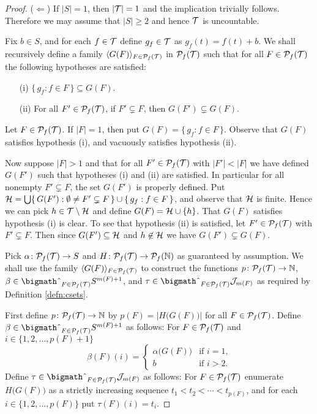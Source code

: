 \begin{proof}
  ($\Leftarrow$)
  If $|S| = 1$, then $|\mathcal{T}| = 1$ and the implication trivially follows. 
  Therefore we may assume that $|S| \ge 2$ and hence $\mathcal{T}$ is uncountable. 

  Fix $b \in S$, and for each $f \in \mathcal{T}$ define $g_f \in \mathcal{T}$ as $g_f(t) = f(t) + b$. 
  We shall recursively define a family $\langle G(F) \rangle_{F \in \mathcal{P}_f(\mathcal{T})}$ in $\mathcal{P}_f(\mathcal{T})$ such that for all $F \in \mathcal{P}_f(\mathcal{T})$ the following hypotheses are satisfied: 
  \begin{itemize}
    \item[(i)]
      $\{\, g_f : f \in F \,\} \subseteq G(F)$.

    \item[(ii)]
      For all $F' \in \mathcal{P}_f(\mathcal{T})$, if $F' \subsetneq F$, then $G(F') \subsetneq G(F)$. 
  \end{itemize}

  Let $F \in \mathcal{P}_f(\mathcal{T})$. 
  If $|F| = 1$, then put $G(F) = \{\, g_f : f \in F \,\}$.
  Observe that $G(F)$ satisfies hypothesis (i), and vacuously satisfies hypothesis (ii).

  Now suppose $|F| > 1$ and that for all $F' \in \mathcal{P}_f(\mathcal{T})$ with $|F'| < |F|$ we have defined $G(F')$ such that hypotheses (i) and (ii) are satisfied. 
  In particular for all nonempty $F' \subsetneq F$, the set $G(F')$ is properly defined. 
  Put $\mathcal{H} = \bigcup\{\, G(F') : \emptyset \ne F' \subsetneq F \,\} \cup \{\, g_f : f \in F \,\}$, and observe that $\mathcal{H}$ is finite. 
  Hence we can pick $h \in \mathcal{T} \setminus \mathcal{H}$ and define $G(F) = \mathcal{H} \cup \{h\}$. 
  That $G(F)$ satisfies hypothesis (i) is clear. 
  To see that hypothesis (ii) is satisfied, let $F' \in \mathcal{P}_f(\mathcal{T})$ with $F' \subsetneq F$.
  Then since $G(F') \subseteq \mathcal{H}$ and $h \not\in \mathcal{H}$ we have $G(F') \subsetneq G(F)$.   
  
  Pick $\alpha \colon \mathcal{P}_f(\mathcal{T}) \to S$ and $H \colon \mathcal{P}_f(\mathcal{T}) \to \mathcal{P}_f(\mathbb{N})$ as guaranteed by assumption.
  We shall use the family $\langle G(F) \rangle_{F \in \mathcal{P}_f(\mathcal{T})}$ to construct the functions $p \colon \mathcal{P}_f(\mathcal{T}) \to \mathbb{N}$, $\beta \in \bigtimes_{F \in \Pf(\calT)} S^{m(F)+1}$, and $\tau \in \bigtimes_{F \in \Pf(\calT)} \calJ_{m(F)}$ as required by Definition \ref{defn:csets}.

  First define $p \colon \mathcal{P}_f(\mathcal{T}) \to \mathbb{N}$ by $p(F) = |H\bigl( G(F) \bigr)|$ for all $F \in \mathcal{P}_f(\mathcal{T})$. 
  Define $\beta \in \bigtimes_{F \in \Pf(\calT)} S^{m(F)+1}$ as follows:
  For $F \in \mathcal{P}_f(\mathcal{T})$ and $i \in \{1, 2, \ldots, p(F)+1\}$
  \[
    \beta(F)(i) =
    \begin{cases}
      \alpha \bigl( G(F) \bigr) & \mbox{if $i=1$,} \\
      b & \mbox{if $i > 2$}.
    \end{cases}
  \]
  Define $\tau \in \bigtimes_{F \in \Pf(\calT)} \calJ_{m(F)}$ as follows:
  For $F \in \mathcal{P}_f(\mathcal{T})$ enumerate $H \bigl( G(F) \bigr)$ as a strictly increasing sequence $t_1 < t_2 < \cdots < t_{p(F)}$, and for each $i \in \{1, 2, \ldots, p(F)\}$ put $\tau(F)(i) = t_i$.
  

\end{proof}
